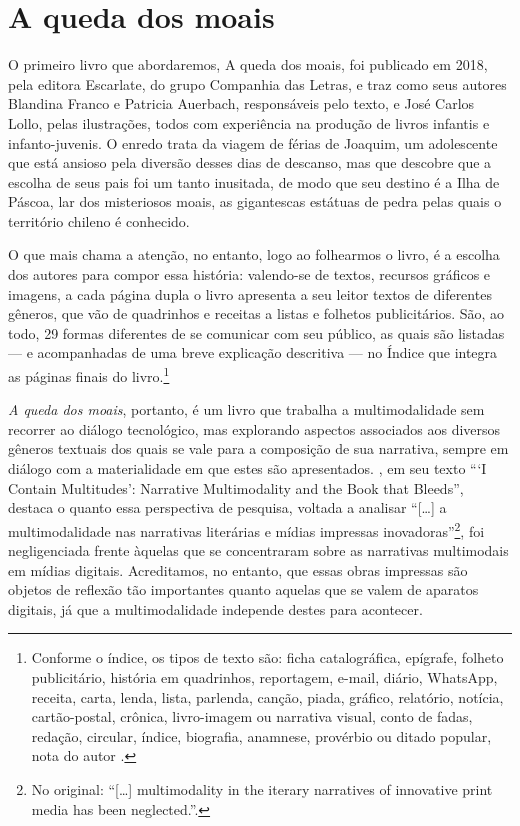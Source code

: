 \documentclass[portuguese]{textolivre}
\begin{document}
\section{A queda dos moais}\label{sec-conduta}

O primeiro livro que abordaremos, A queda dos moais, foi publicado em 2018,
pela editora Escarlate, do grupo Companhia das Letras, e traz como seus autores
Blandina Franco e Patricia Auerbach, responsáveis pelo texto, e José Carlos
Lollo, pelas ilustrações, todos com experiência na produção de livros infantis
e infanto-juvenis. O enredo trata da viagem de férias de Joaquim, um
adolescente que está ansioso pela diversão desses dias de descanso, mas que
descobre que a escolha de seus pais foi um tanto inusitada, de modo que seu
destino é a Ilha de Páscoa, lar dos misteriosos moais, as gigantescas estátuas
de pedra pelas quais o território chileno é conhecido.

O que mais chama a atenção, no entanto, logo ao folhearmos o livro, é a escolha
dos autores para compor essa história: valendo-se de textos, recursos gráficos
e imagens, a cada página dupla o livro apresenta a seu leitor textos de
diferentes gêneros, que vão de quadrinhos e receitas a listas e folhetos
publicitários. São, ao todo, 29 formas diferentes de se comunicar com seu
público, as quais são listadas — e acompanhadas de uma breve explicação
descritiva — no Índice que integra as páginas finais do
livro.\footnote{Conforme o índice, os tipos de texto são: ficha catalográfica,
epígrafe, folheto publicitário, história em quadrinhos, reportagem, e-mail,
diário, WhatsApp, receita, carta, lenda, lista, parlenda, canção, piada,
gráfico, relatório, notícia, cartão-postal, crônica, livro-imagem ou narrativa
visual, conto de fadas, redação, circular, índice, biografia, anamnese,
provérbio ou ditado popular, nota do autor \cite[p.~56-59]{franco_queda_2018}.} 

\textit{A queda dos moais}, portanto, é um livro que trabalha a multimodalidade
sem recorrer ao diálogo tecnológico, mas explorando aspectos associados aos
diversos gêneros textuais dos quais se vale para a composição de sua narrativa,
sempre em diálogo com a materialidade em que estes são apresentados.
\textcite{gibbons_i_2010}, em seu texto “‘I Contain Multitudes’: Narrative
Multimodality and the Book that Bleeds”, destaca o quanto essa perspectiva de
pesquisa, voltada a analisar “[…] a multimodalidade nas narrativas literárias
e mídias impressas inovadoras”\footnote{No original: “[…] multimodality in the
iterary narratives of innovative print media has been neglected.”.}, foi
negligenciada frente àquelas que se concentraram sobre as narrativas
multimodais em mídias digitais. Acreditamos, no entanto, que essas obras
impressas são objetos de reflexão tão importantes quanto aquelas que se valem
de aparatos digitais, já que a multimodalidade independe destes para acontecer.
\end{document}
